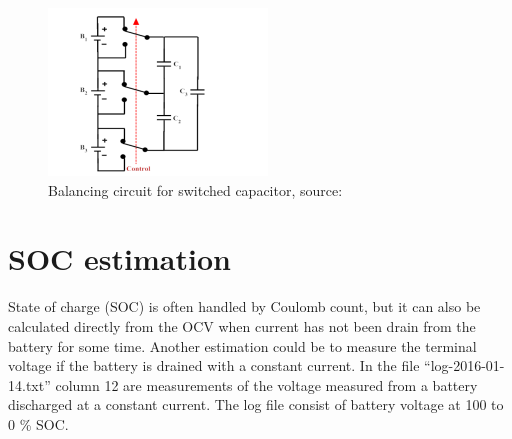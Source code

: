 \documentclass[paper=letter, fontsize=10pt]{article}
\begin{document}
\begin{figure}[H]
\centering
\includegraphics[scale=0.8]{Figures/capacitor}
\caption{Balancing circuit for switched capacitor, source: \cite{balancing}}
\label{fig_capacitor}
\end{figure}


\section{SOC estimation}


State of charge (SOC) is often handled by Coulomb count, but it can also be calculated directly from the OCV when current has not been drain from the battery for some time. Another estimation could be to measure the terminal voltage if the battery is drained with a constant current. In the file “log-2016-01-14.txt” column 12 are measurements of the voltage measured from a battery discharged at a constant current. The log file consist of battery voltage at 100 to 0 \% SOC. 
\end{document}
